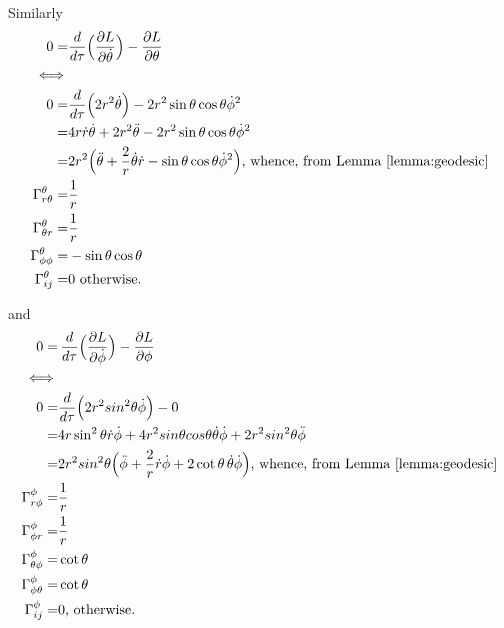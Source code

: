 \documentclass[]{article}
\begin{document}
Similarly
\begin{align*}
0=&\frac{d}{d \tau}\Big(\frac{\partial L}{\partial \dot{\theta}}\Big)-\frac{\partial L}{\partial \theta}\\
\iff&\\
0=&\frac{d}{d \tau}\Big(2r^2 \dot {\theta} \Big) -2 r^2 \sin \theta\cos \theta \dot{\phi}^2\\
=&4 r \dot r  \dot{\theta}  + 2 r^2 \ddot \theta -2 r^2 \sin \theta\cos \theta \dot{\phi}^2\\
=& 2r^2\Big(\ddot{\theta}+\frac{2}{r}\dot{\theta}\dot{r} -\sin \theta\cos \theta \dot{\phi}^2\Big)\text{, whence, from Lemma \ref{lemma:geodesic}}\\
\Gamma^{\theta}_{r\theta}=&\frac{1}{r}\\
\Gamma^{\theta}_{\theta r}=&\frac{1}{r}\\
\Gamma^{\theta}_{\phi\phi}=&-\sin \theta \cos \theta\\
\Gamma^{\theta}_{ij}=&0 \text{ otherwise.}
\end{align*}

and
\begin{align*}
0=&\,\frac{d}{d \tau}\Big(\frac{\partial L}{\partial \dot{\phi}}\Big)-\frac{\partial L}{\partial \phi}\\
\iff&\\
0=&\frac{d}{d \tau}\Big( 2 r^2 sin^2\theta \dot{\phi}\Big) - 0\\
=&4 r \sin^2 \theta \dot {r} \dot{\phi}+ 4 r^2 sin\theta cos\theta \dot{\theta} \dot{\phi}+2 r^2 sin^2\theta \ddot{\phi}\\
=& 2 r^2 sin^2\theta \Big(\ddot{\phi} + \frac{2}{r}\dot{r}\dot{\phi} + 2 \cot\theta \, \dot{\theta}\dot{\phi}\Big)\text{, whence, from Lemma \ref{lemma:geodesic}}\\
\Gamma^{\phi}_{r\phi}=&\frac{1}{r}\\
\Gamma^{\phi}_{\phi r}=&\frac{1}{r}\\
\Gamma^{\phi}_{\theta\phi}=&\cot\theta\\
\Gamma^{\phi}_{\phi\theta}=&\cot\theta\\
\Gamma^{\phi}_{ij}=&0 \text{, otherwise.}
\end{align*}
\end{document}
